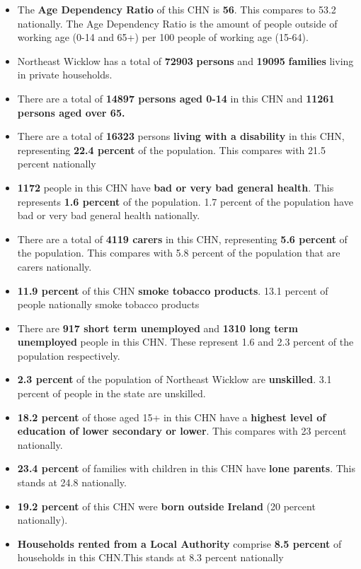 \documentclass{article}
\begin{document}
\begin{itemize}

\item The \textbf{Age Dependency Ratio} of this CHN is  \textbf{56}. This compares to 53.2 nationally. The Age Dependency Ratio is the amount of people outside of working age (0-14 and 65+) per 100 people of working age (15-64). 

\item Northeast Wicklow has a total of \textbf{\num{72903}} \textbf{persons} and  \textbf{\num{19095}} \textbf{families} living in private households.

\item There are a total of \textbf{\num{14897} persons aged 0-14} in this CHN and \textbf{\num{11261} persons aged over 65.} 

\item There are a total of \textbf{\num{16323}} persons \textbf{living with a disability} in this CHN, representing \textbf{22.4 percent} of the population. This compares with  21.5 percent nationally

\item \textbf{\num{1172}} people in this CHN have \textbf{bad or very bad general health}. This represents \textbf{1.6 percent} of the population. 1.7 percent of the population have bad or very bad general health nationally. 

\item There are a total of \textbf{\num{4119} carers} in this CHN, representing \textbf{5.6 percent} of the population. This compares with 5.8 percent of the population that are carers nationally. 

\item \textbf{11.9 percent} of this CHN \textbf{smoke tobacco products}. 13.1 percent of people nationally smoke tobacco products

\item There are \textbf{\num{917} short term unemployed} and \textbf{\num{1310} long term unemployed} people in this CHN. These represent 1.6 and 2.3 percent of the population respectively.

\item  \textbf{2.3 percent} of the population of Northeast Wicklow are \textbf{unskilled}. 3.1 percent of people in the state are unskilled.

\item \textbf{18.2 percent} of those aged 15+ in this CHN have a \textbf{highest level of education of lower secondary or lower}. This compares with 23 percent nationally. 

\item \textbf{23.4 percent} of families with children in this CHN have \textbf{lone parents}. This stands at 24.8 nationally.

\item \textbf{19.2 percent} of this CHN were \textbf{born outside Ireland} (20 percent nationally).

\item \textbf{Households rented from a Local Authority} comprise \textbf{8.5 percent} of households in this CHN.This stands at 8.3 percent nationally

\end{itemize}
\end{document}
